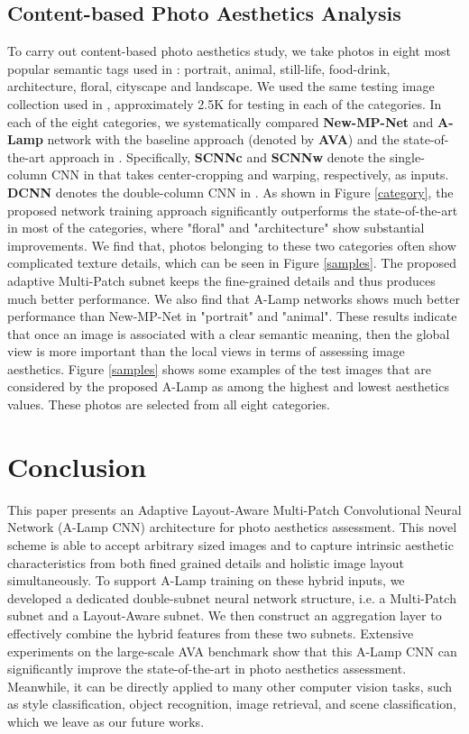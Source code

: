 \documentclass[10pt,twocolumn,letterpaper]{article}
\begin{document}
\subsection{Content-based Photo Aesthetics Analysis} \label{content}
To carry out content-based photo aesthetics study, we take photos in eight most popular semantic tags used in \cite{Murray:MMP2012:AVA}: portrait, animal, still-life, food-drink, architecture, floral, cityscape and landscape. We used the same testing image collection used in \cite{Lu:2014:TMM:rating}, approximately 2.5K for testing in each of the categories. In each of the eight categories, we systematically compared \textbf{New-MP-Net} and \textbf{A-Lamp} network with the baseline approach \cite{Murray:MMP2012:AVA} (denoted by \textbf{AVA}) and the state-of-the-art approach in \cite{Lu:2014:TMM:rating}. Specifically, \textbf{SCNN{\tiny c}} and \textbf{SCNN{\tiny w}} denote the single-column CNN in \cite{Lu:2014:TMM:rating} that takes center-cropping and warping, respectively, as inputs. \textbf{DCNN} denotes the double-column CNN in \cite{Lu:2014:TMM:rating}. As shown in Figure \ref{category}, the proposed network training approach significantly outperforms the state-of-the-art in most of the categories, where "floral" and "architecture" show substantial improvements. We find that, photos belonging to these two categories often show complicated texture details, which can be seen in Figure \ref{samples}. The proposed adaptive Multi-Patch subnet keeps the fine-grained details and thus produces much better performance. We also find that A-Lamp networks shows much better performance than New-MP-Net in "portrait" and "animal". These results indicate that once an image is associated with a clear semantic meaning, then the global view is more important than the local views in terms of assessing image aesthetics. Figure \ref{samples} shows some examples of the test images that are considered by the proposed A-Lamp as among the highest and lowest aesthetics values. These photos are selected from all eight categories.

\section{Conclusion}
This paper presents an Adaptive Layout-Aware Multi-Patch Convolutional Neural Network (A-Lamp CNN) architecture for photo aesthetics assessment. This novel scheme is able to accept arbitrary sized images and to capture intrinsic aesthetic characteristics from both fined grained details and holistic image layout simultaneously. To support A-Lamp training on these hybrid inputs, we  developed a dedicated double-subnet neural network structure, i.e. a Multi-Patch subnet and a Layout-Aware subnet. We then construct an aggregation layer to effectively combine the hybrid features from these two subnets. Extensive experiments on the large-scale AVA benchmark show that this A-Lamp CNN can significantly improve the state-of-the-art in photo aesthetics assessment. Meanwhile, it can be directly applied to many other computer vision tasks, such as style classification, object recognition, image retrieval, and scene classification, which we leave as our future works.

\cleardoublepage
{\small
	
	
}
\end{document}
